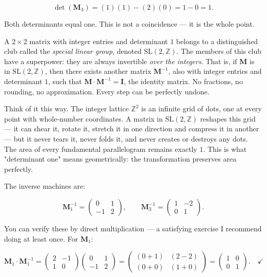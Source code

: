 \[
\det(\mathbf{M}_3) = (1)(1) - (2)(0) = 1 - 0 = 1.
\]

Both determinants equal one. This is not a coincidence --- it is the whole point.

A $2 \times 2$ matrix with integer entries and determinant $1$ belongs to a distinguished club called the \textit{special linear group}, denoted $\mathrm{SL}(2, \mathbb{Z})$. The members of this club have a superpower: they are always invertible \textit{over the integers}. That is, if $\mathbf{M}$ is in $\mathrm{SL}(2, \mathbb{Z})$, then there exists another matrix $\mathbf{M}^{-1}$, also with integer entries and determinant $1$, such that $\mathbf{M} \cdot \mathbf{M}^{-1} = \mathbf{I}$, the identity matrix. No fractions, no rounding, no approximation. Every step can be perfectly undone.

Think of it this way. The integer lattice $\mathbb{Z}^2$ is an infinite grid of dots, one at every point with whole-number coordinates. A matrix in $\mathrm{SL}(2, \mathbb{Z})$ reshapes this grid --- it can shear it, rotate it, stretch it in one direction and compress it in another --- but it never tears it, never folds it, and never creates or destroys any dots. The area of every fundamental parallelogram remains exactly $1$. This is what "determinant one" means geometrically: the transformation preserves area perfectly.

The inverse machines are:

\[
\mathbf{M}_1^{-1} = \begin{pmatrix} 0 & 1 \\ -1 & 2 \end{pmatrix}, \qquad
\mathbf{M}_3^{-1} = \begin{pmatrix} 1 & -2 \\ 0 & 1 \end{pmatrix}.
\]

You can verify these by direct multiplication --- a satisfying exercise I recommend doing at least once. For $\mathbf{M}_1$:

\[
\mathbf{M}_1 \cdot \mathbf{M}_1^{-1} = \begin{pmatrix} 2 & -1 \\ 1 & 0 \end{pmatrix} \begin{pmatrix} 0 & 1 \\ -1 & 2 \end{pmatrix} = \begin{pmatrix} (0+1) & (2-2) \\ (0+0) & (1+0) \end{pmatrix} = \begin{pmatrix} 1 & 0 \\ 0 & 1 \end{pmatrix}. \quad \checkmark
\]

